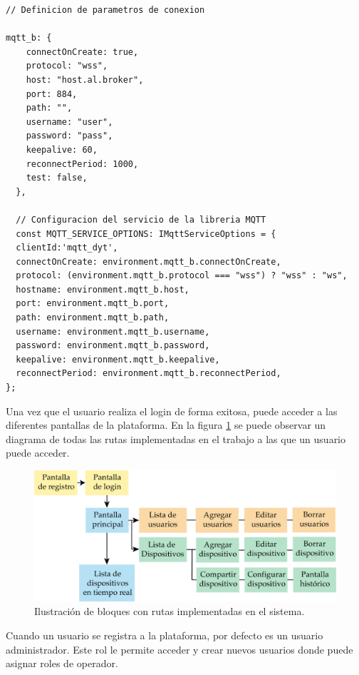 \begin{lstlisting}[label=cod:mqtt-angular,caption=Implementación de cliente MQTT en Angular utilizando la librería ngx-mqtt.] 
// Definicion de parametros de conexion

mqtt_b: {
    connectOnCreate: true,
    protocol: "wss",
    host: "host.al.broker",
    port: 884,
    path: "",
    username: "user",
    password: "pass",
    keepalive: 60,
    reconnectPeriod: 1000,
    test: false,
  },
  
  // Configuracion del servicio de la libreria MQTT
  const MQTT_SERVICE_OPTIONS: IMqttServiceOptions = {
  clientId:'mqtt_dyt',
  connectOnCreate: environment.mqtt_b.connectOnCreate,
  protocol: (environment.mqtt_b.protocol === "wss") ? "wss" : "ws",
  hostname: environment.mqtt_b.host,
  port: environment.mqtt_b.port,
  path: environment.mqtt_b.path,
  username: environment.mqtt_b.username,
  password: environment.mqtt_b.password,
  keepalive: environment.mqtt_b.keepalive,
  reconnectPeriod: environment.mqtt_b.reconnectPeriod,
};

\end{lstlisting} 

Una vez que el usuario realiza el login de forma exitosa, puede acceder a las diferentes pantallas de la plataforma. En la figura \ref{fig:bloque-pantallas} se puede observar un diagrama de todas las rutas implementadas en el trabajo a las que un usuario puede acceder. 

\begin{figure}[htpb]
	\centering
	\includegraphics[scale=.75]{./Figures/bloques-pantallas.png}
	\caption[Rutas del sistema]{Ilustración de bloques con rutas implementadas en el sistema.}
	\label{fig:bloque-pantallas}
\end{figure}

Cuando un usuario se registra a la plataforma, por defecto es un usuario administrador. Este rol le permite acceder y crear nuevos usuarios donde puede asignar roles de operador. 

